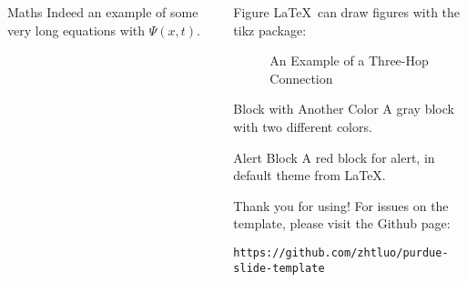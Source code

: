 \documentclass{purdue-poster}
\begin{document}
\begin{frame}{}
\begin{columns}[c]
\begin{column}{.48\linewidth}
\begin{block}{Maths}
        Indeed an example of some very long equations with $\Psi (x,t)$.
    \end{block}
    
    \end{column}

    \begin{column}{.48\linewidth}
    
    \begin{block}{Figure}
        \LaTeX\ can draw figures with the tikz package:
        \begin{figure}[h]
        \centering
        \caption{An Example of a Three-Hop Connection}
        \label{fig:three-hop}
        \end{figure}
    \end{block}

    \begin{exampleblock}{Block with Another Color}
    A gray block with two different colors.
    \end{exampleblock}

    \begin{alertblock}{Alert Block}
    A red block for alert, in default theme from \LaTeX.

    \bigskip
    
    \lipsum[7]
    \end{alertblock}

    \begin{block}{Thank you for using!}
        For issues on the template, please visit the Github page:
        
        {\small\texttt{https://github.com/zhtluo/purdue-slide-template}\par}
    \end{block}


\end{column}
\end{columns}
\end{frame}
\end{document}
